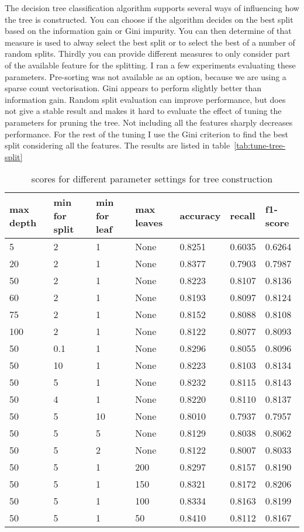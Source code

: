 \documentclass[11pt]{article}
\begin{document}
The decision tree classification algorithm supports several ways of influencing how the tree is constructed. You can choose if the algorithm decides on the best split based on the information gain or Gini impurity. You can then determine of that measure is used to alway select the best split or to select the best of a number of random splits. Thirdly you can provide different measures to only consider part of the available feature for the splitting. I ran a few experiments evaluating these parameters. Pre-sorting was not available as an option, because we are using a sparse count vectorisation. Gini appears to perform slightly better than information gain. Random split evaluation can improve performance, but does not give a stable result and makes it hard to evaluate the effect of tuning the parameters for pruning the tree. Not including all the features sharply decreases performance. For the rest of the tuning I use the Gini criterion to find the best split considering all the features. The results are listed in table~\ref{tab:tune-tree-split}

\begin{table*}[ht]\footnotesize
\centering
\begin{tabular}{ l l l l l l l }
max depth & min for split & min for leaf & max leaves & accuracy & recall & f1-score \\
\hline
5   & 2   & 1  & None & 0.8251 & 0.6035 & 0.6264 \\
20  & 2   & 1  & None & 0.8377 & 0.7903 & 0.7987 \\
50  & 2   & 1  & None & 0.8223 & 0.8107 & 0.8136 \\
60  & 2   & 1  & None & 0.8193 & 0.8097 & 0.8124 \\
75  & 2   & 1  & None & 0.8152 & 0.8088 & 0.8108 \\
100 & 2   & 1  & None & 0.8122 & 0.8077 & 0.8093 \\
50  & 0.1 & 1  & None & 0.8296 & 0.8055 & 0.8096 \\
50  & 10  & 1  & None & 0.8223 & 0.8103 & 0.8134 \\
50  & 5   & 1  & None & 0.8232 & 0.8115 & 0.8143 \\
50  & 4   & 1  & None & 0.8220 & 0.8110 & 0.8137 \\
50  & 5   & 10 & None & 0.8010 & 0.7937 & 0.7957 \\
50  & 5   & 5  & None & 0.8129 & 0.8038 & 0.8062 \\
50  & 5   & 2  & None & 0.8122 & 0.8007 & 0.8033 \\
50  & 5   & 1  & 200  & 0.8297 & 0.8157 & 0.8190 \\
50  & 5   & 1  & 150  & 0.8321 & 0.8172 & 0.8206 \\
50  & 5   & 1  & 100  & 0.8334 & 0.8163 & 0.8199 \\
50  & 5   & 1  & 50   & 0.8410 & 0.8112 & 0.8167 \\
\end{tabular}
\caption{scores for different parameter settings for tree construction}
\label{tab:tune-tree-prune}
\end{table*}
\end{document}
